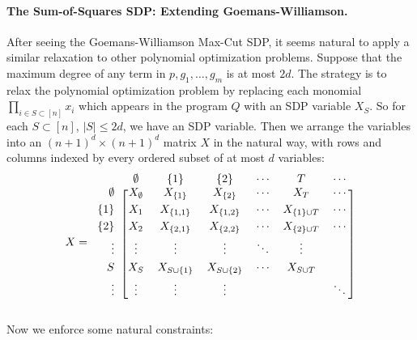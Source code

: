 \documentclass[a4paper,11pt]{article}
\theoremstyle{definition}
\begin{document}
\paragraph{The Sum-of-Squares SDP: Extending Goemans-Williamson.}
After seeing the Goemans-Williamson Max-Cut SDP, it seems natural to apply a similar relaxation to other polynomial optimization problems.
Suppose that the maximum degree of any term in $p, g_1,\ldots,g_m$ is at most $2d$.
The strategy is to relax the polynomial optimization problem by replacing each monomial $\prod_{i\in S \subset [n]} x_i$ which appears in the program $Q$ with an SDP variable $X_S$.
So for each $S \subset [n]$, $|S| \le 2d$, we have an SDP variable.
Then we arrange the variables into an $(n+1)^d \times (n+1)^d$ matrix $X$ in the natural way, with rows and columns indexed by every ordered subset of at most $d$ variables:
\[
X = 
\begin{blockarray}{ccccccc}
& \emptyset & \{1\} & \{2\} & \cdots & T & \cdots \\
\begin{block}{r[cccccc]}
\vspace{1mm}
\emptyset & X_{\emptyset} & X_{\{1\}} & X_{\{2\}} & \cdots & X_{T} & \cdots\\
\vspace{1mm}
\{1\} & X_{1} & X_{\{1,1\}} & X_{\{1,2\}} & \cdots & X_{\{1\} \cup T} & \cdots \\
\vspace{1mm}
\{2\} & X_{2} & X_{\{2,1\}} & X_{\{2,2\}} & \cdots & X_{\{2\}\cup T} &  \cdots \\
\vspace{1mm}
\vdots & \vdots & \vdots& \vdots & \ddots  & \vdots & \\
\vspace{1mm}
S & X_{S} & X_{S\cup \{1\}} & X_{S\cup \{2\}} & \cdots & X_{S\cup T} & \\
\vspace{1mm}
\vdots & \vdots & \vdots& \vdots& & & \ddots \\
\end{block}
\end{blockarray}
\]
Now we enforce some natural constraints:
\end{document}

